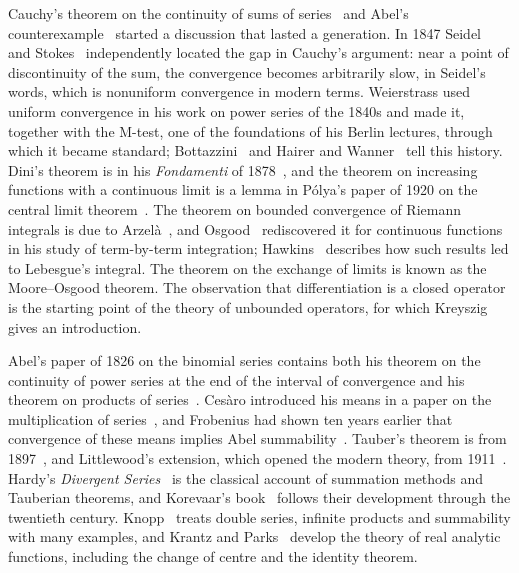 \chapternotes

Cauchy's theorem on the continuity of sums of series~\cite{cauchy1821} and Abel's counterexample~\cite{abel1826} started a discussion that lasted a generation. In 1847 Seidel~\cite{seidel1847} and Stokes~\cite{stokes1847} independently located the gap in Cauchy's argument: near a point of discontinuity of the sum, the convergence becomes arbitrarily slow, in Seidel's words, which is nonuniform convergence in modern terms. Weierstrass used uniform convergence in his work on power series of the 1840s and made it, together with the M-test, one of the foundations of his Berlin lectures, through which it became standard; Bottazzini~\cite{bottazzini1986} and Hairer and Wanner~\cite{hairer1996analysis} tell this history. Dini's theorem is in his \emph{Fondamenti} of 1878~\cite{dini1878}, and the theorem on increasing functions with a continuous limit is a lemma in P\'olya's paper of 1920 on the central limit theorem~\cite{polya1920}. The theorem on bounded convergence of Riemann integrals is due to Arzel\`a~\cite{arzela1885}, and Osgood~\cite{osgood1897} rediscovered it for continuous functions in his study of term-by-term integration; Hawkins~\cite{hawkins1975} describes how such results led to Lebesgue's integral. The theorem on the exchange of limits is known as the Moore--Osgood theorem. The observation that differentiation is a closed operator is the starting point of the theory of unbounded operators, for which Kreyszig~\cite[Sect.~4.13]{kreyszig1978} gives an introduction.

Abel's paper of 1826 on the binomial series contains both his theorem on the continuity of power series at the end of the interval of convergence and his theorem on products of series~\cite{abel1826}. Ces\`aro introduced his means in a paper on the multiplication of series~\cite{cesaro1890}, and Frobenius had shown ten years earlier that convergence of these means implies Abel summability~\cite{frobenius1880}. Tauber's theorem is from 1897~\cite{tauber1897}, and Littlewood's extension, which opened the modern theory, from 1911~\cite{littlewood1911}. Hardy's \emph{Divergent Series}~\cite{hardy1949divergent} is the classical account of summation methods and Tauberian theorems, and Korevaar's book~\cite{korevaar2004} follows their development through the twentieth century. Knopp~\cite{knopp1990} treats double series, infinite products and summability with many examples, and Krantz and Parks~\cite{krantz2002primer} develop the theory of real analytic functions, including the change of centre and the identity theorem.


